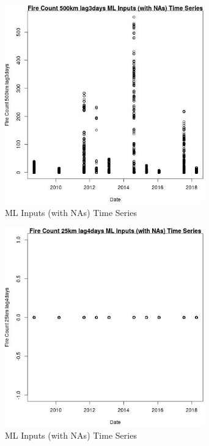 \begin{figure} 
\centering  
\includegraphics[width=0.77\textwidth]{Code_Outputs/Report_ML_input_PM25_Step4_part_e_de_duplicated_aves_compiled_2019-05-18wNAs_Fire_Count_500km_lag3daysvDate.jpg} 
\caption{\label{fig:Report_ML_input_PM25_Step4_part_e_de_duplicated_aves_compiled_2019-05-18wNAsFire_Count_500km_lag3daysvDate}ML Inputs (with NAs) Time Series} 
\end{figure} 
 

\begin{figure} 
\centering  
\includegraphics[width=0.77\textwidth]{Code_Outputs/Report_ML_input_PM25_Step4_part_e_de_duplicated_aves_compiled_2019-05-18wNAs_Fire_Count_25km_lag4daysvDate.jpg} 
\caption{\label{fig:Report_ML_input_PM25_Step4_part_e_de_duplicated_aves_compiled_2019-05-18wNAsFire_Count_25km_lag4daysvDate}ML Inputs (with NAs) Time Series} 
\end{figure} 
 

